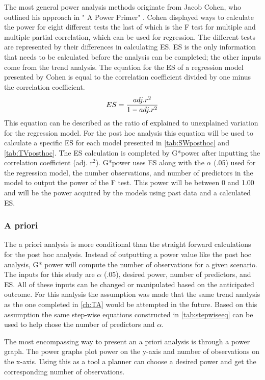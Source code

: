 The most general power analysis methods originate from Jacob Cohen, who outlined his approach in " A Power Primer" \citep{cohen1992power}.
Cohen displayed ways to calculate the power for eight different tests the last of which is the F test for multiple and multiple partial correlation, which can be used for regression.
The different tests are represented by their differences in calculating ES.
ES is the only information that needs to be calculated before the analysis can be completed; the other inputs come from the trend analysis.
The equation for the ES of a regression model presented by Cohen is equal to the correlation coefficient divided by one minus the correlation coefficient.
\begin{equation} \label{eq:ES}
    ES = {adj. r^2 \over {1-adj. r^2}}
\end{equation}
This equation can be described as the ratio of explained to unexplained variation for the regression model.
For the post hoc analysis this equation will be used to calculate a specific ES for each model presented in \autoref{tab:SWposthoc} and \autoref{tab:TVposthoc}.
The ES calculation is completed by G*power after inputting the correlation coefficient (adj. r$^2$).
G*power uses ES along with the $\alpha$ (.05) used for the regression model, the number observations, and number of predictors in the model to output the power of the F test.
This power will be between 0 and 1.00 and will be the power acquired by the models using past data and a calculated ES.

\subsubsection{A priori}

The a priori analysis is more conditional than the straight forward calculations for the post hoc analysis.
Instead of outputting a power value like the post hoc analysis, G* power will compute the number of observations for a given scenario. 
The inputs for this study are $\alpha$ (.05), desired power, number of predictors, and ES.
All of these inputs can be changed or manipulated based on the anticipated outcome.
For this analysis the assumption was made that the same trend analysis as the one completed in \autoref{ch:TA} would be attempted in the future.
Based on this assumption the same step-wise equations constructed in \autoref{tab:stepwiseeq} can be used to help chose the number of predictors and $\alpha$.

The most encompassing way to present an a priori analysis is through a power graph.
The power graphs plot power on the y-axis and number of observations on the x-axis.
Using this as a tool a planner can choose a desired power and get the corresponding number of observations.

